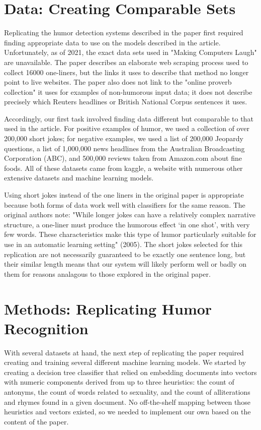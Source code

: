 \documentclass[11pt,a4paper]{article}
\begin{document}
\section{Data: Creating Comparable Sets}
Replicating the humor detection systems described in the paper first required finding appropriate data to use on the models described in the article. Unfortunately, as of 2021, the exact data sets used in "Making Computers Laugh" are unavailable. The paper describes an elaborate web scraping process used to collect 16000 one-liners, but the links it uses to describe that method no longer point to live websites. The paper also does not link to the "online proverb collection" it uses for examples of non-humorous input data; it does not describe precisely which Reuters headlines or British National Corpus sentences it uses.

Accordingly, our first task involved finding data different but comparable to that used in the article. For positive examples of humor, we used a collection of over 200,000 short jokes; for negative examples, we used a list of 200,000 Jeopardy questions, a list of 1,000,000 news headlines from the Australian Broadcasting Corporation (ABC), and 500,000 reviews taken from Amazon.com about fine foods. \cite{short-jokes} \cite{news-headlines} \cite{jeopardy-questions} \cite{amazon-reviews} All of these datasets came from kaggle, a website with numerous other extensive datasets and machine learning models.

Using short jokes instead of the one liners in the original paper is appropriate because both forms of data work well with classifiers for the same reason. The original authors note: "While longer jokes can have a relatively complex narrative structure, a one-liner must produce the humorous effect `in one shot', with very few words. These characteristics make this type of humor particularly suitable for use in an automatic learning setting" (2005). The short jokes selected for this replication are not necessarily guaranteed to be exactly one sentence long, but their similar length means that our system will likely perform well or badly on them for reasons analagous to those explored in the original paper.

\section{Methods: Replicating Humor Recognition}
With several datasets at hand, the next step of replicating the paper required creating and training several different machine learning models. We started by creating a decision tree classifier that relied on embedding documents into vectors with numeric components derived from up to three heuristics: the count of antonyms, the count of words related to sexuality, and the count of alliterations and rhymes found in a given document. No off-the-shelf mapping between those heuristics and vectors existed, so we needed to implement our own based on the content of the paper.
\end{document}
